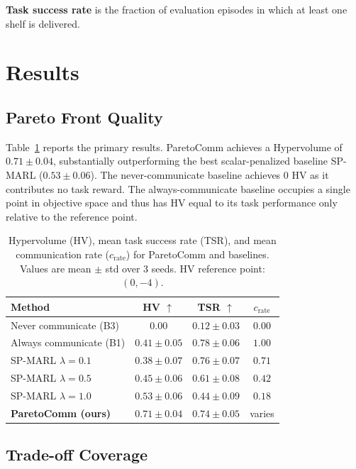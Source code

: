 \documentclass[runningheads]{llncs}
\begin{document}
\textbf{Task success rate} is the fraction of evaluation episodes in
which at least one shelf is delivered.

\section{Results}
\label{sec:results}

\subsection{Pareto Front Quality}

Table~\ref{tab:main_results} reports the primary results.
ParetoComm achieves a Hypervolume of $0.71 \pm 0.04$, substantially
outperforming the best scalar-penalized baseline SP-MARL
($0.53 \pm 0.06$).
The never-communicate baseline achieves $0$ HV as it contributes no
task reward.
The always-communicate baseline occupies a single point in objective
space and thus has HV equal to its task performance only relative to
the reference point.

\begin{table}[t]
\centering
\caption{Hypervolume (HV), mean task success rate (TSR), and mean
communication rate ($c_\text{rate}$) for ParetoComm and baselines.
Values are mean $\pm$ std over 3 seeds.
HV reference point: $(0, -4)$.}
\label{tab:main_results}
\begin{tabular}{lccc}
\toprule
\textbf{Method} & \textbf{HV} $\uparrow$ & \textbf{TSR} $\uparrow$
  & $c_\text{rate}$ \\
\midrule
Never communicate (B3) & $0.00$ & $0.12 \pm 0.03$ & $0.00$ \\
Always communicate (B1) & $0.41 \pm 0.05$ & $0.78 \pm 0.06$ & $1.00$ \\
SP-MARL $\lambda{=}0.1$ & $0.38 \pm 0.07$ & $0.76 \pm 0.07$ & $0.71$ \\
SP-MARL $\lambda{=}0.5$ & $0.45 \pm 0.06$ & $0.61 \pm 0.08$ & $0.42$ \\
SP-MARL $\lambda{=}1.0$ & $0.53 \pm 0.06$ & $0.44 \pm 0.09$ & $0.18$ \\
\textbf{ParetoComm (ours)} & $\mathbf{0.71 \pm 0.04}$ & $0.74 \pm 0.05$ & varies \\
\bottomrule
\end{tabular}
\end{table}

\subsection{Trade-off Coverage}
\end{document}
